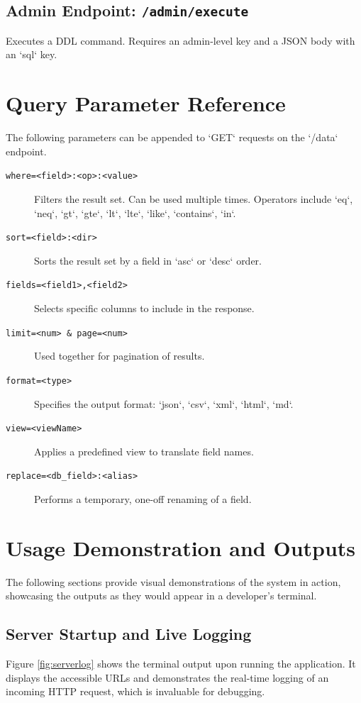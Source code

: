 \documentclass[12pt, a4paper]{report}
\begin{document}
\subsection{Admin Endpoint: \texttt{/admin/execute}}
Executes a DDL command. Requires an admin-level key and a JSON body with an `sql` key.

\section{Query Parameter Reference}
The following parameters can be appended to `GET` requests on the `/data` endpoint.

\begin{description}
    \item[\texttt{where=<field>:<op>:<value>}] Filters the result set. Can be used multiple times. Operators include `eq`, `neq`, `gt`, `gte`, `lt`, `lte`, `like`, `contains`, `in`.
    \item[\texttt{sort=<field>:<dir>}] Sorts the result set by a field in `asc` or `desc` order.
    \item[\texttt{fields=<field1>,<field2>}] Selects specific columns to include in the response.
    \item[\texttt{limit=<num> \& page=<num>}] Used together for pagination of results.
    \item[\texttt{format=<type>}] Specifies the output format: `json`, `csv`, `xml`, `html`, `md`.
    \item[\texttt{view=<viewName>}] Applies a predefined view to translate field names.
    \item[\texttt{replace=<db_field>:<alias>}] Performs a temporary, one-off renaming of a field.
\end{description}

\section{Usage Demonstration and Outputs}
The following sections provide visual demonstrations of the system in action, showcasing the outputs as they would appear in a developer's terminal.

\subsection{Server Startup and Live Logging}
Figure \ref{fig:serverlog} shows the terminal output upon running the application. It displays the accessible URLs and demonstrates the real-time logging of an incoming HTTP request, which is invaluable for debugging.
\end{document}
